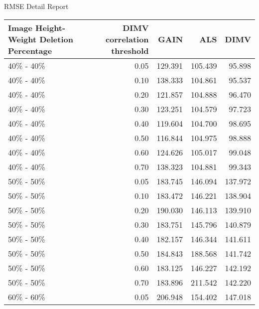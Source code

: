  RMSE Detail Report 
 \begin{tabular}{lrrrr}
\toprule
Image Height-Weight Deletion Percentage &  DIMV correlation threshold &    GAIN &     ALS &    DIMV \\
\midrule
                              40\% - 40\% &                        0.05 & 129.391 & 105.439 &  95.898 \\
                              40\% - 40\% &                        0.10 & 138.333 & 104.861 &  95.537 \\
                              40\% - 40\% &                        0.20 & 121.857 & 104.888 &  96.470 \\
                              40\% - 40\% &                        0.30 & 123.251 & 104.579 &  97.723 \\
                              40\% - 40\% &                        0.40 & 119.604 & 104.700 &  98.695 \\
                              40\% - 40\% &                        0.50 & 116.844 & 104.975 &  98.888 \\
                              40\% - 40\% &                        0.60 & 124.626 & 105.017 &  99.048 \\
                              40\% - 40\% &                        0.70 & 138.323 & 104.881 &  99.343 \\
                              50\% - 50\% &                        0.05 & 183.745 & 146.094 & 137.972 \\
                              50\% - 50\% &                        0.10 & 183.472 & 146.221 & 138.904 \\
                              50\% - 50\% &                        0.20 & 190.030 & 146.113 & 139.910 \\
                              50\% - 50\% &                        0.30 & 183.751 & 145.796 & 140.879 \\
                              50\% - 50\% &                        0.40 & 182.157 & 146.344 & 141.611 \\
                              50\% - 50\% &                        0.50 & 184.843 & 188.568 & 141.742 \\
                              50\% - 50\% &                        0.60 & 183.125 & 146.227 & 142.192 \\
                              50\% - 50\% &                        0.70 & 183.896 & 211.542 & 142.220 \\
                              60\% - 60\% &                        0.05 & 206.948 & 154.402 & 147.018 \\

\end{tabular}

